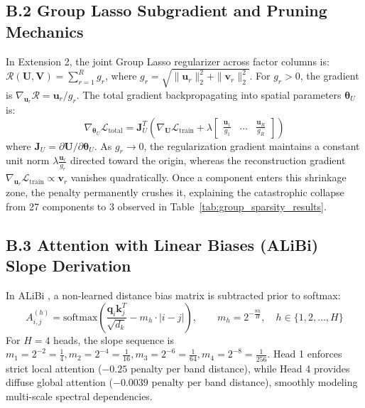 \subsection*{B.2 Group Lasso Subgradient and Pruning Mechanics}
In Extension 2, the joint Group Lasso regularizer across factor columns is: $\mathcal{R}(\mathbf{U}, \mathbf{V}) = \sum_{r=1}^R g_r$, where $g_r = \sqrt{\|\mathbf{u}_r\|_2^2 + \|\mathbf{v}_r\|_2^2}$. For $g_r > 0$, the gradient is $\nabla_{\mathbf{u}_r} \mathcal{R} = \mathbf{u}_r / g_r$. The total gradient backpropagating into spatial parameters $\boldsymbol{\theta}_U$ is:
\begin{equation}
\nabla_{\boldsymbol{\theta}_U} \mathcal{L}_\text{total} = \mathbf{J}_U^T \left( \nabla_{\mathbf{U}} \mathcal{L}_\text{train} + \lambda \begin{bmatrix} \frac{\mathbf{u}_1}{g_1} & \dots & \frac{\mathbf{u}_R}{g_R} \end{bmatrix} \right)
\end{equation}
where $\mathbf{J}_U = \partial \mathbf{U} / \partial \boldsymbol{\theta}_U$. As $g_r \to 0$, the regularization gradient maintains a constant unit norm $\lambda \frac{\mathbf{u}_r}{g_r}$ directed toward the origin, whereas the reconstruction gradient $\nabla_{\mathbf{u}_r} \mathcal{L}_\text{train} \propto \mathbf{v}_r$ vanishes quadratically. Once a component enters this shrinkage zone, the penalty permanently crushes it, explaining the catastrophic collapse from 27 components to 3 observed in Table~\ref{tab:group_sparsity_results}.

\subsection*{B.3 Attention with Linear Biases (ALiBi) Slope Derivation}
In ALiBi \citep{press2022train}, a non-learned distance bias matrix is subtracted prior to softmax:
\begin{equation}
A_{i, j}^{(h)} = \text{softmax}\left( \frac{\mathbf{q}_i \mathbf{k}_j^T}{\sqrt{d_k}} - m_h \cdot |i - j| \right), \qquad m_h = 2^{-\frac{8h}{H}}, \quad h \in \{1, 2, \dots, H\}
\end{equation}
For $H=4$ heads, the slope sequence is $m_1 = 2^{-2} = \frac{1}{4}, m_2 = 2^{-4} = \frac{1}{16}, m_3 = 2^{-6} = \frac{1}{64}, m_4 = 2^{-8} = \frac{1}{256}$. Head 1 enforces strict local attention ($-0.25$ penalty per band distance), while Head 4 provides diffuse global attention ($-0.0039$ penalty per band distance), smoothly modeling multi-scale spectral dependencies.
